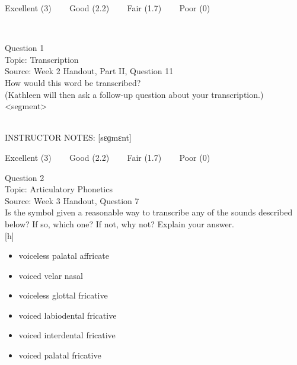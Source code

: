 \documentclass[12pt]{article}
\begin{document}
\vfill
Excellent (3) ~~~ Good (2.2) ~~~ Fair (1.7) ~~~ Poor (0)
\newpage

\begin{center}
\textbf{{\color{red}{\HUGE END OF EXAM}}}\\

\end{center}
\newpage

\begin{center}
\textbf{{\color{blue}{\HUGE START OF EXAM\\}}}

\textbf{{\color{blue}{\HUGE Student ID: 96220\\}}}

\textbf{{\color{blue}{\HUGE \\}}}

\end{center}
\newpage

{\large Question 1}\\

Topic: Transcription\\
Source: Week 2 Handout, Part II, Question 11\\

How would this word be transcribed?\\ (Kathleen will then ask a follow-up question about your transcription.)\\

<segment>


~\\
INSTRUCTOR NOTES: [sɛɡmɛnt]


\vfill
Excellent (3) ~~~ Good (2.2) ~~~ Fair (1.7) ~~~ Poor (0)
\newpage

{\large Question 2}\\

Topic: Articulatory Phonetics\\
Source: Week 3 Handout, Question 7\\

Is the symbol given a reasonable way to transcribe any of the sounds described below? If so, which one? If not, why not? Explain your answer.\\

{[h]}

\begin{itemize} \item voiceless palatal affricate \item voiced velar nasal \item voiceless glottal fricative \item voiced labiodental fricative \item voiced interdental fricative \item voiced palatal fricative \end{itemize}
\end{document}
